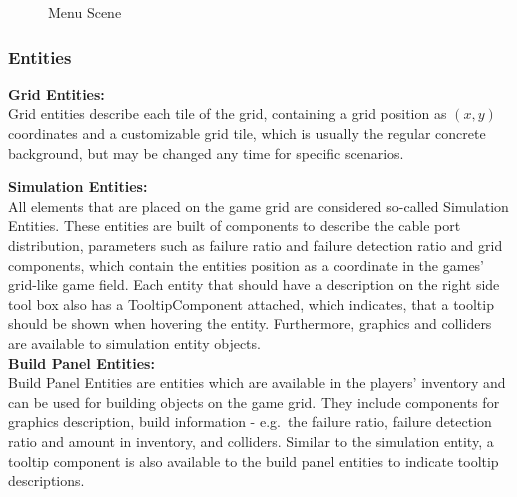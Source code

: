 \begin{figure}
    \centering
    \setlength{\fboxsep}{1pt}
    \setlength{\fboxrule}{1pt}
    \caption{Menu Scene}
    \label{fig:menu-scene}
\end{figure}

\subsubsection{Entities}\label{subsubsec:entities2}
\textbf{Grid Entities:} \\
Grid entities describe each tile of the grid, containing a grid position as $(x,y)$ coordinates and a customizable grid tile,
which is usually the regular concrete background, but may be changed any time for specific scenarios.

\textbf{Simulation Entities:} \\
All elements that are placed on the game grid are considered so-called Simulation Entities.
These entities are built of components to describe the cable port distribution, parameters such as failure ratio and failure detection ratio and grid components, which contain the
entities position as a coordinate in the games' grid-like game field.
Each entity that should have a description on the right side tool box also has a TooltipComponent attached, which indicates, that
a tooltip should be shown when hovering the entity.
Furthermore, graphics and colliders are available to simulation entity objects.
\\
\textbf{Build Panel Entities:} \\
Build Panel Entities are entities which are available in the players' inventory and can be used for building objects on the game grid.
They include components for graphics description, build information - e.g.\ the failure ratio, failure detection ratio and amount in inventory,
and colliders.
Similar to the simulation entity, a tooltip component is also available to the build panel entities to indicate tooltip descriptions.
\\

